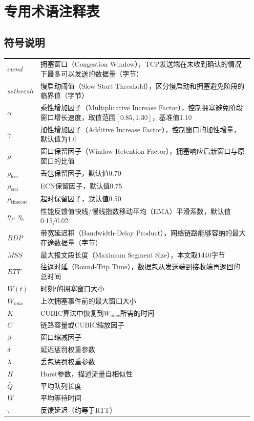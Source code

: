 \chapter*{专用术语注释表}

\section*{符号说明}
\begin{supertabular}{p{3cm}p{10cm}}
$cwnd$ & 拥塞窗口（Congestion Window），TCP发送端在未收到确认的情况下最多可以发送的数据量（字节） \\
$ssthresh$ & 慢启动阈值（Slow Start Threshold），区分慢启动和拥塞避免阶段的临界值（字节） \\
$\alpha$ & 乘性增加因子（Multiplicative Increase Factor），控制拥塞避免阶段窗口增长速度，取值范围$[0.85, 1.30]$，基准值1.10 \\
$\gamma$ & 加性增加因子（Additive Increase Factor），控制窗口的加性增量，默认值为1.0 \\
$\rho$ & 窗口保留因子（Window Retention Factor），拥塞响应后新窗口与原窗口的比值 \\
$\rho_{\text{loss}}$ & 丢包保留因子，默认值0.70 \\
$\rho_{\text{ecn}}$ & ECN保留因子，默认值0.75 \\
$\rho_{\text{timeout}}$ & 超时保留因子，默认值0.50 \\
$\eta_f,\ \eta_b$ & 性能反馈值快线/慢线指数移动平均（EMA）平滑系数，默认值0.15/0.02 \\
$BDP$ & 带宽延迟积（Bandwidth-Delay Product），网络链路能够容纳的最大在途数据量（字节） \\
$MSS$ & 最大报文段长度（Maximum Segment Size），本文取1440字节 \\
$RTT$ & 往返时延（Round-Trip Time），数据包从发送端到接收端再返回的总时间 \\
$W(t)$ & 时刻$t$的拥塞窗口大小 \\
$W_{max}$ & 上次拥塞事件前的最大窗口大小 \\
$K$ & CUBIC算法中恢复到$W_{max}$所需的时间 \\
$C$ & 链路容量或CUBIC缩放因子 \\
$\beta$ & 窗口缩减因子 \\
$\delta$ & 延迟惩罚权重参数 \\
$\lambda$ & 丢包惩罚权重参数 \\
$H$ & Hurst参数，描述流量自相似性 \\
$\bar{Q}$ & 平均队列长度 \\
$\bar{W}$ & 平均等待时间 \\
$\tau$ & 反馈延迟（约等于RTT） \\
\end{supertabular}

